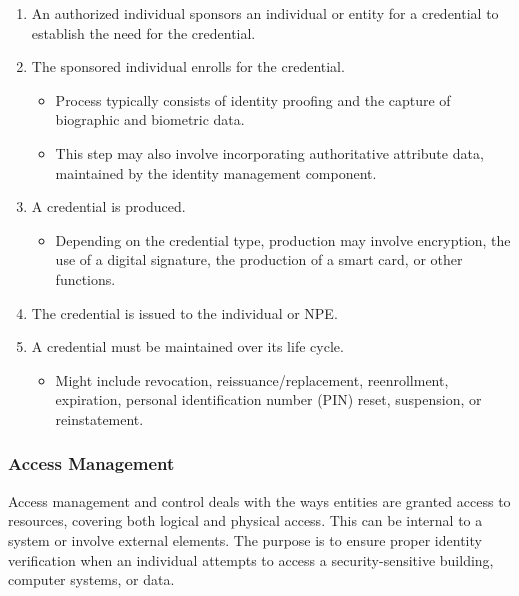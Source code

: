 \documentclass{article}
\begin{document}
                                    \begin{enumerate}
                                        \item An authorized individual sponsors an individual or entity for a credential to establish the need for the credential.
                                        \item The sponsored individual enrolls for the credential.
                                        \begin{itemize}
                                            \item Process typically consists of identity proofing and the capture of biographic and biometric data.
                                            \item This step may also involve incorporating authoritative attribute data, maintained by the identity management component.
                                        \end{itemize}
                                        \item A credential is produced.
                                        \begin{itemize}
                                            \item Depending on the credential type, production may involve encryption, the use of a digital signature, the production of a smart card, or other functions.
                                        \end{itemize}
                                        \item The credential is issued to the individual or NPE.
                                        \item A credential must be maintained over its life cycle.
                                        \begin{itemize}
                                            \item Might include revocation, reissuance/replacement, reenrollment, expiration, personal identification number (PIN) reset, suspension, or reinstatement.
                                        \end{itemize}
                                    \end{enumerate}

                                    \subsubsection{Access Management}
                                    Access management and control deals with the ways entities are granted access to resources, covering both logical and physical access. This can be internal to a system or involve external elements. The purpose is to ensure proper identity verification when an individual attempts to access a security-sensitive building, computer systems, or data.
\end{document}
